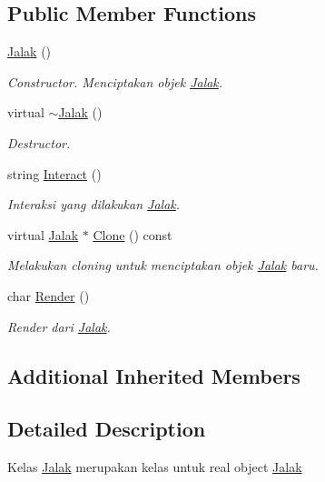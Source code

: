 \subsection*{Public Member Functions}
\begin{DoxyCompactItemize}
\item 
\hyperlink{classJalak_a3887e1118830188e1aeffee215b2816f}{Jalak} ()
\begin{DoxyCompactList}\small\item\em Constructor. Menciptakan objek \hyperlink{classJalak}{Jalak}. \end{DoxyCompactList}\item 
virtual \hyperlink{classJalak_a2c1e4e68ab9126c034520c2c845a5afa}{$\sim$\+Jalak} ()
\begin{DoxyCompactList}\small\item\em Destructor. \end{DoxyCompactList}\item 
string \hyperlink{classJalak_a864b931f04f1580759c4a108e1734bb8}{Interact} ()
\begin{DoxyCompactList}\small\item\em Interaksi yang dilakukan \hyperlink{classJalak}{Jalak}. \end{DoxyCompactList}\item 
virtual \hyperlink{classJalak}{Jalak} $\ast$ \hyperlink{classJalak_a85b145221386cdca75274b4438250161}{Clone} () const 
\begin{DoxyCompactList}\small\item\em Melakukan cloning untuk menciptakan objek \hyperlink{classJalak}{Jalak} baru. \end{DoxyCompactList}\item 
char \hyperlink{classJalak_af500189104401b66d6ab4e3b1106ce74}{Render} ()
\begin{DoxyCompactList}\small\item\em Render dari \hyperlink{classJalak}{Jalak}. \end{DoxyCompactList}\end{DoxyCompactItemize}
\subsection*{Additional Inherited Members}


\subsection{Detailed Description}
Kelas \hyperlink{classJalak}{Jalak} merupakan kelas untuk real object \hyperlink{classJalak}{Jalak} 

